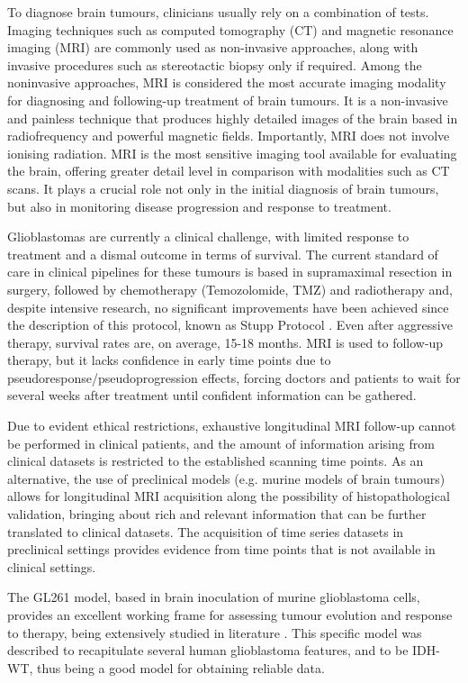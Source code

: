 \documentclass[12pt, a4paper]{report}
\begin{document}
To diagnose brain tumours, clinicians usually rely on a combination of tests. Imaging techniques such as computed tomography (CT) and magnetic resonance imaging (MRI) are commonly used as non-invasive approaches, along with invasive procedures such as stereotactic biopsy only if required. Among the noninvasive approaches, MRI is considered the most accurate imaging modality for diagnosing and following-up treatment of brain tumours. It is a non-invasive and painless technique that produces highly detailed images of the brain based in radiofrequency and powerful magnetic fields. Importantly, MRI does not involve ionising 
radiation. MRI is the most sensitive imaging tool available for evaluating the brain, offering greater detail level in comparison with modalities such as CT scans. It plays a crucial role not only in the initial diagnosis of brain tumours, but also in monitoring disease progression and response to treatment. 

Glioblastomas are currently a clinical challenge, with limited response to treatment and a dismal outcome in terms of survival. The current standard of care in clinical pipelines for these tumours is based in supramaximal resection in surgery, followed by chemotherapy (Temozolomide, TMZ) and radiotherapy and, despite intensive research, no significant improvements have been achieved since the description of this protocol, known as Stupp Protocol \cite{Stupp2005}. Even after aggressive therapy, survival rates are, on average, 15-18 months. MRI is used to follow-up therapy, but it lacks confidence in early time points due to pseudoresponse/pseudoprogression effects, forcing doctors and patients to wait for several weeks after treatment until confident information can be gathered. 

Due to evident ethical restrictions, exhaustive longitudinal MRI follow-up cannot be performed in clinical patients, and the amount of information arising from clinical datasets is restricted to the established scanning time points. As an alternative, the use of preclinical models (e.g. murine models of brain tumours) allows for longitudinal MRI acquisition along the possibility of histopathological validation, bringing about rich and relevant information that can be further translated to clinical datasets. The acquisition of time series datasets in preclinical settings provides evidence from time points that is not available in clinical settings. 

The GL261 model, based in brain inoculation of murine glioblastoma cells, provides an excellent working frame for assessing tumour evolution and response to therapy, being extensively studied in literature \cite{Wu2020, Roberts2020}. This specific model was described to recapitulate several human glioblastoma features, and to be IDH-WT, thus being a good model for obtaining reliable data.   
\end{document}
